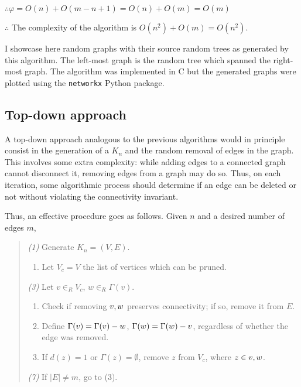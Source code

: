 \documentclass[
]{article}
\providecommand{\tightlist}{%
  \setlength{\itemsep}{0pt}\setlength{\parskip}{0pt}}
\begin{document}
\(\therefore \varphi = O(n) + O(m - n + 1) = O(n) + O(m) = O(m)\)

\(\therefore\) The complexity of the algorithm is
\(O(n^2) + O(m) = O(n^2)\).

I showcase here random graphs with their source random trees as
generated by this algorithm. The left-most graph is the random tree
which spanned the right-most graph. The algorithm was implemented in C
but the generated graphs were plotted using the \texttt{networkx} Python
package.

\hypertarget{top-down-approach}{%
\subsection{Top-down approach}\label{top-down-approach}}

A top-down approach analogous to the previous algorithms would in
principle consist in the generation of a \(K_n\) and the random removal
of edges in the graph. This involves some extra complexity: while adding
edges to a connected graph cannot disconnect it, removing edges from a
graph may do so. Thus, on each iteration, some algorithmic process
should determine if an edge can be deleted or not without violating the
connectivity invariant.

Thus, an effective procedure goes as follows. Given \(n\) and a desired
number of edges \(m\),

\begin{quote}
\emph{(1)} Generate \(K_n = (V, E)\).

\begin{enumerate}
\def\labelenumi{(\arabic{enumi})}
\setcounter{enumi}{1}
\tightlist
\item
  Let \(V_c = V\) the list of vertices which can be pruned.
\end{enumerate}

\emph{(3)} Let \(v \in_R V_c\), \(w \in_R \Gamma(v)\).

\begin{enumerate}
\def\labelenumi{(\arabic{enumi})}
\setcounter{enumi}{3}
\item
  Check if removing \(\\{v, w\\}\) preserves connectivity; if so, remove
  it from \(E\).
\item
  Define \(\Gamma(v) = \Gamma(v) - \\{w\\}\),
  \(\Gamma(w) = \Gamma(w) - \\{v\\}\), regardless of whether the edge
  was removed.
\item
  If \(d(z) = 1\) or \(\Gamma(z) = \emptyset\), remove \(z\) from
  \(V_c\), where \(z \in \\{v, w\\}\).
\end{enumerate}

\emph{(7)} If \(|E| \neq m\), go to (3).
\end{quote}
\end{document}
